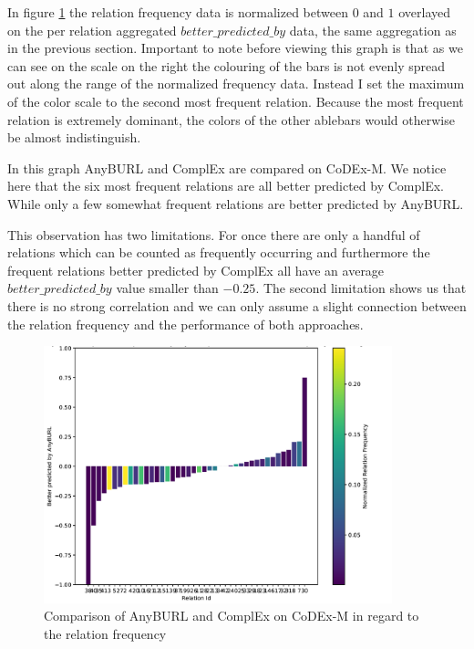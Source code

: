 In figure \ref{fig:relation_freq_anyburl_complex_codex} the relation frequency data is normalized between $0$ and $1$ overlayed on the per relation aggregated $better\_predicted\_by$ data, the same aggregation as in the previous section. Important to note before viewing this graph is that as we can see on the scale on the right the colouring of the bars is not evenly spread out along the range of the normalized frequency data. Instead I set the maximum of the color scale to the second most frequent relation. Because the most frequent relation is extremely dominant, the colors of the other ablebars would otherwise be almost indistinguish. 

In this graph AnyBURL and ComplEx are compared on CoDEx-M. We notice here that the six most frequent relations are all better predicted by ComplEx. While only a few somewhat frequent relations are better predicted by AnyBURL. 

This observation has two limitations. For once there are only a handful of relations which can be counted as frequently occurring and furthermore the frequent relations better predicted by ComplEx all have an average $better\_predicted\_by$ value smaller than $-0.25$. The second limitation shows us that there is no strong correlation and we can only assume a slight connection between the relation frequency and the performance of both approaches.

\begin{figure}[H]
\centering
\includegraphics[width=0.9\textwidth]{images/relation_freq_anyburl_complex_codex.PNG}
\caption{Comparison of AnyBURL and ComplEx on CoDEx-M in regard to the relation frequency}
\label{fig:relation_freq_anyburl_complex_codex}
\end{figure}

